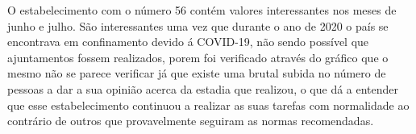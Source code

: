 O estabelecimento com o número 56 contém valores interessantes nos meses de junho e julho. São interessantes uma vez que durante o ano de 2020 o país se encontrava em confinamento devido á COVID-19, não sendo possível que ajuntamentos fossem realizados, porem foi verificado através do gráfico que o mesmo não se parece verificar já que existe uma brutal subida no número de pessoas a dar a sua opinião acerca da estadia que realizou, o que dá a entender que esse estabelecimento continuou a realizar as suas tarefas com normalidade ao contrário de outros que provavelmente seguiram as normas recomendadas.

\label{cap9}
